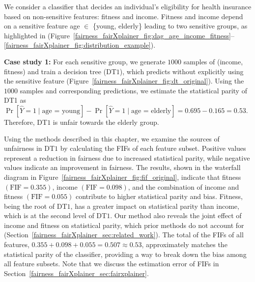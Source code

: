 \begin{example}
	\label{fairness_fairXplainer_ex:motivating_example} We consider a classifier that decides an individual's eligibility for health insurance based on non-sensitive features: fitness  and income. Fitness and income depend on a sensitive feature age $ \in $ \{young, elderly\} leading to two sensitive groups, as highlighted in (Figure~\ref{fairness_fairXplainer_fig:dag_age_income_fitness}--\ref{fairness_fairXplainer_fig:distribution_example}). 
	
	\textbf{Case study 1:} For each sensitive group, we generate $ 1000 $ samples of (income, fitness) and train a decision tree (DT$ 1 $), which predicts without explicitly using the sensitive feature (Figure~\ref{fairness_fairXplainer_fig:dt_original}). %
	Using the $1000$ samples and corresponding predictions, we estimate the statistical parity of DT1 as $ \Pr[\widehat{Y} = 1  \mid  \text{age = young} ] - \Pr[\widehat{Y} = 1  \mid  \text{age = elderly}] = 0.695 - 0.165 = 0.53 $. Therefore, DT$ 1 $ is unfair towards the elderly group.
	
	
	Using the methods described in this chapter, we examine the sources of unfairness in DT$ 1 $ by calculating the FIFs of each feature subset. Positive values represent a reduction in fairness due to increased statistical parity, while negative values indicate an improvement in fairness. The results, shown in the waterfall diagram in Figure~\ref{fairness_fairXplainer_fig:fif_original}, indicate that fitness $(\mathrm{FIF} = 0.355)$, income $(\mathrm{FIF} = 0.098)$, and the combination of income and fitness $(\mathrm{FIF} = 0.055)$ contribute to higher statistical parity and bias. Fitness, being the root of DT$ 1 $, has a greater impact on statistical parity than income, which is at the second level of DT$ 1 $. Our method also reveals the joint effect of income and fitness on statistical parity, which prior methods do not account for (Section~\ref{fairness_fairXplainer_sec:related_work}). The total of the FIFs of all features, $ 0.355 + 0.098 + 0.055 = 0.507 \approx 0.53 $, approximately matches the statistical parity of the classifier, providing a way to break down the bias among all feature subsets. Note that we discuss the estimation error of FIFs in Section~\ref{fairness_fairXplainer_sec:fairxplainer}.
	

\end{example}
